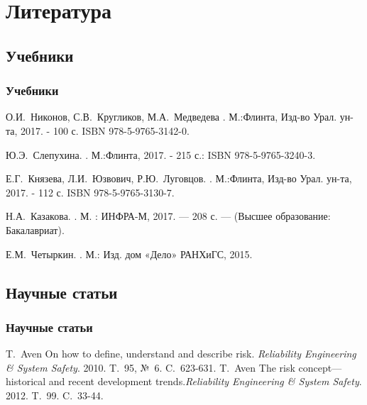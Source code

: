\documentclass[_fin_decisions_lectures.tex]{subfiles}
\begin{document}
\section*{Литература}
\subsection*{Учебники}

\begin{frame}[allowframebreaks]
  \frametitle<presentation>{Учебники}
    
  \begin{thebibliography}{10}
    
  \beamertemplatebookbibitems
	О.И.~Никонов, С.В.~Кругликов, М.А.~Медведева
    .
    \newblock М.:Флинта, Изд-во Урал. ун-та, 2017. - 100 с. ISBN 978-5-9765-3142-0.
    
    Ю.Э.~Слепухина. 
    .
    \newblock М.:Флинта, 2017. - 215 с.: ISBN 978-5-9765-3240-3.
    
    \pagebreak    
	Е.Г.~Князева, Л.И.~Юзвович, Р.Ю.~Луговцов. 
	.
	\newblock М.:Флинта, Изд-во Урал. ун-та, 2017. - 112 с. ISBN 978-5-9765-3130-7.

	Н.А.~Казакова. 
	.
	\newblock М. : ИНФРА-М, 2017. — 208 с. — (Высшее образование: Бакалавриат).

\pagebreak
	Е.М.~Четыркин. 
    .
    \newblock М.: Изд. дом «Дело» РАНХиГС, 2015.
  
  \end{thebibliography}
\end{frame}

\subsection*{Научные статьи}

\begin{frame}[shrink=15]
  \frametitle<presentation>{Научные статьи}
  \begin{thebibliography}{10}
  \beamertemplatearticlebibitems
    \newblock T.~Aven 
    \newblock On how to define, understand and describe risk. {\em Reliability Engineering \& System Safety}. 2010. T.~95, №~6. C.~623-631.
    \newblock T.~Aven 
    \newblock The risk concept—historical and recent development trends.{\em Reliability Engineering \& System Safety}. 2012. T.~99. C.~33-44.
   \end{thebibliography}
\end{frame}
\end{document}
